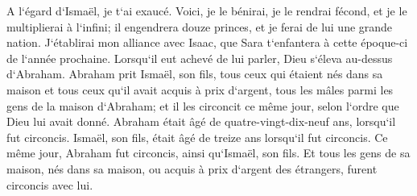 \verse A l`égard d`Ismaël, je t`ai exaucé. Voici, je le bénirai, je le rendrai fécond, et je le multiplierai à l`infini; il engendrera douze princes, et je ferai de lui une grande nation. 
\verse J`établirai mon alliance avec Isaac, que Sara t`enfantera à cette époque-ci de l`année prochaine. 
\verse Lorsqu`il eut achevé de lui parler, Dieu s`éleva au-dessus d`Abraham. 
\verse Abraham prit Ismaël, son fils, tous ceux qui étaient nés dans sa maison et tous ceux qu`il avait acquis à prix d`argent, tous les mâles parmi les gens de la maison d`Abraham; et il les circoncit ce même jour, selon l`ordre que Dieu lui avait donné. 
\verse Abraham était âgé de quatre-vingt-dix-neuf ans, lorsqu`il fut circoncis. 
\verse Ismaël, son fils, était âgé de treize ans lorsqu`il fut circoncis. 
\verse Ce même jour, Abraham fut circoncis, ainsi qu`Ismaël, son fils. 
\verse Et tous les gens de sa maison, nés dans sa maison, ou acquis à prix d`argent des étrangers, furent circoncis avec lui. 

